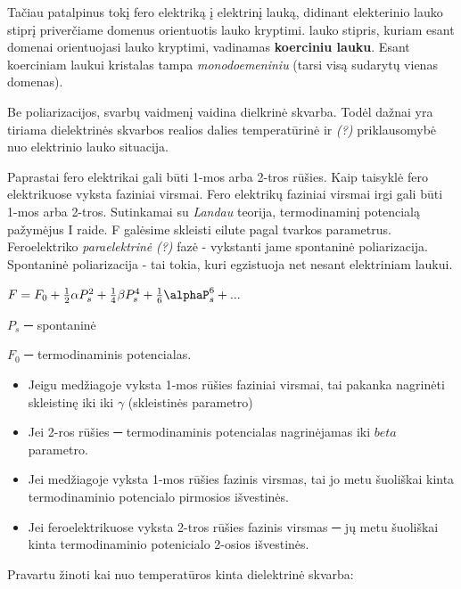 Tačiau patalpinus tokį fero elektriką į elektrinį lauką,
didinant elekterinio lauko stiprį priverčiame domenus orientuotis lauko kryptimi.
lauko stipris, kuriam esant domenai orientuojasi lauko kryptimi,
vadinamas \textbf{koerciniu lauku}.
Esant koerciniam laukui kristalas tampa \textit{monodoemeniniu} (tarsi visą sudarytų vienas domenas).

Be poliarizacijos, svarbų vaidmenį vaidina dielkrinė skvarba.
Todėl dažnai yra tiriama dielektrinės skvarbos realios dalies temperatūrinė ir \textit{(?)} priklausomybė nuo elektrinio lauko situacija.

Paprastai fero elektrikai gali būti 1-mos arba 2-tros rūšies.
Kaip taisyklė fero elektrikuose vyksta faziniai virsmai.
Fero elektrikų faziniai virsmai irgi gali būti 1-mos arba 2-tros.
Sutinkamai su \textit{Landau} teorija, termodinaminį potencialą pažymėjus
I raide. F galėsime skleisti eilute pagal tvarkos parametrus.
Feroelektriko \textit{paraelektrinė} \textit{(?)} fazė - vykstanti jame spontaninė poliarizacija.
Spontaninė poliarizacija - tai tokia, kuri egzistuoja net nesant elektriniam
laukui.

$F = F_0 + \frac{1}{2}\alpha P_s^2 + \frac{1}{4}\beta P_s^4 + \frac{1}{6}\alphaP_s^6 + ...$

$P_s$ ─ spontaninė

$F_0$ ─ termodinaminis potencialas.

\begin{itemize}
	\item Jeigu medžiagoje vyksta 1-mos rūšies faziniai virsmai,
	tai pakanka nagrinėti skleistinę iki iki $\gamma$ (skleistinės parametro)
	\item Jei 2-ros rūšies ─ termodinaminis potencialas nagrinėjamas iki $beta$
	parametro.
\end{itemize}

\begin{itemize}
	\item Jei medžiagoje vyksta 1-mos rūšies fazinis virsmas,
	tai jo metu šuoliškai kinta termodinaminio potencialo pirmosios išvestinės.
	\item Jei feroelektrikuose vyksta 2-tros rūšies fazinis virsmas
	─ jų metu šuoliškai kinta termodinaminio potenicialo 2-osios išvestinės.
\end{itemize}

Pravartu žinoti kai nuo temperatūros kinta dielektrinė skvarba:

